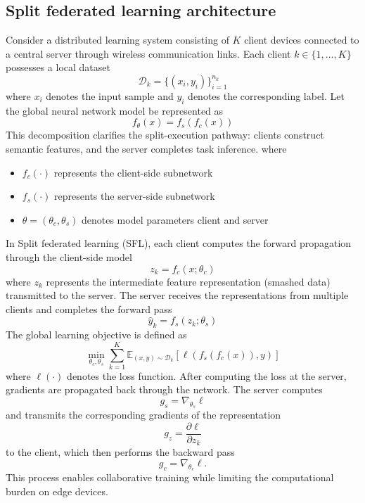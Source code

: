 \documentclass[10pt,journal]{IEEEtran}
\begin{document}
\subsection{Split federated learning architecture}
Consider a distributed learning system consisting of $K$ client devices connected to a central server through wireless communication links. Each client $k \in \{1,\dots,K\}$ possesses a local dataset
\begin{equation}
\mathcal{D}_k = \{(x_i,y_i)\}_{i=1}^{n_k}
\end{equation}
where $x_i$ denotes the input sample and $y_i$ denotes the corresponding label.
Let the global neural network model be represented as
\begin{equation}
f_{\theta}(x) = f_s(f_c(x))
\end{equation}
This decomposition clarifies the split-execution pathway: clients construct semantic features, and the server completes task inference.
where
\begin{itemize}
\item $f_c(\cdot)$ represents the client-side subnetwork
\item $f_s(\cdot)$ represents the server-side subnetwork
\item $\theta = (\theta_c,\theta_s)$ denotes model parameters client and server
\end{itemize}
In Split federated learning (SFL), each client computes the forward propagation through the client-side model\cite{thapa2022splitfedfederatedlearningmeets,vepakomma2018splitlearninghealthdistributed}
\begin{equation}
z_k = f_c(x;\theta_c)
\end{equation}
where $z_k$ represents the intermediate feature representation (smashed data) transmitted to the server\cite{vepakomma2018splitlearninghealthdistributed}.
The server receives the representations from multiple clients and completes the forward pass
\begin{equation}
\hat{y}_k = f_s(z_k;\theta_s)
\end{equation}
The global learning objective is defined as
\begin{equation}
\min_{\theta_c,\theta_s} \sum_{k=1}^{K} \mathbb{E}_{(x,y)\sim \mathcal{D}_k}\left[\ell(f_s(f_c(x)),y)\right]
\end{equation}
where $\ell(\cdot)$ denotes the loss function.
After computing the loss at the server, gradients are propagated back through the network. The server computes
\begin{equation}
g_s = \nabla_{\theta_s}\ell
\end{equation}
and transmits the corresponding gradients of the representation
\begin{equation}
g_z = \frac{\partial \ell}{\partial z_k}
\end{equation}
to the client, which then performs the backward pass
\begin{equation}
g_c = \nabla_{\theta_c}\ell.
\end{equation}
This process enables collaborative training while limiting the computational burden on edge devices.
\end{document}
